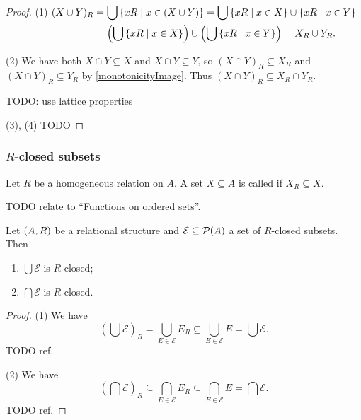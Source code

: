 \begin{proof}\mbox{}

(1) $\begin{aligned}[t]
(X\cup Y)_R &= \bigcup \left\{ xR \;\middle|\; x\in (X\cup Y) \right\} = \bigcup \left\{ xR \;\middle|\; x\in X \right\}\cup \left\{ xR \;\middle|\; x\in Y \right\} \\
&= \left(\bigcup \left\{ xR \;\middle|\; x\in X \right\}\right)\cup \left(\bigcup \left\{ xR \;\middle|\; x\in Y \right\}\right) = X_R \cup Y_R.
\end{aligned}$

(2) We have both $X\cap Y \subseteq X$ and $X\cap Y \subseteq Y$, so $(X\cap Y)_R \subseteq X_R$ and $(X\cap Y)_R \subseteq Y_R$ by \ref{monotonicityImage}. Thus $(X\cap Y)_R \subseteq X_R\cap Y_R$.

TODO: use lattice properties

(3), (4) TODO
\end{proof}

\subsubsection{$R$-closed subsets}
\begin{definition}
Let $R$ be a homogeneous relation on $A$. A set $X\subseteq A$ is called  if $X_R \subseteq X$.
\end{definition}
TODO relate to ``Functions on ordered sets''.

\begin{lemma} \label{meetJoinRClosedSets}
Let $\left( A, R \right)$ be a relational structure and $\mathcal{E} \subseteq \operatorname{\mathcal{P}}(A)$ a set of $R$-closed subsets. Then
\begin{enumerate}
\item $\bigcup \mathcal{E}$ is $R$-closed;
\item $\bigcap \mathcal{E}$ is $R$-closed.
\end{enumerate}
\end{lemma}
\begin{proof}
(1) We have
\[ \left(\bigcup \mathcal{E}\right)_R = \bigcup_{E\in\mathcal{E}} E_R \subseteq \bigcup_{E\in\mathcal{E}} E = \bigcup \mathcal{E}. \]
TODO ref.

(2) We have
\[ \left(\bigcap \mathcal{E}\right)_R \subseteq \bigcap_{E\in\mathcal{E}} E_R \subseteq \bigcap_{E\in\mathcal{E}} E = \bigcap \mathcal{E}.\]
TODO ref.
\end{proof}

